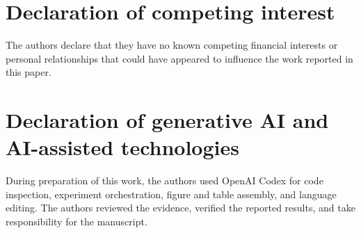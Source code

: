 \documentclass[a4paper,fleqn]{cas-sc}
\begin{document}
\section*{Declaration of competing interest}

The authors declare that they have no known competing financial interests or
personal relationships that could have appeared to influence the work
reported in this paper.

\section*{Declaration of generative AI and AI-assisted technologies}

During preparation of this work, the authors used OpenAI Codex for code
inspection, experiment orchestration, figure and table assembly, and language
editing. The authors reviewed the evidence, verified the reported results, and
take responsibility for the manuscript.



\end{document}
